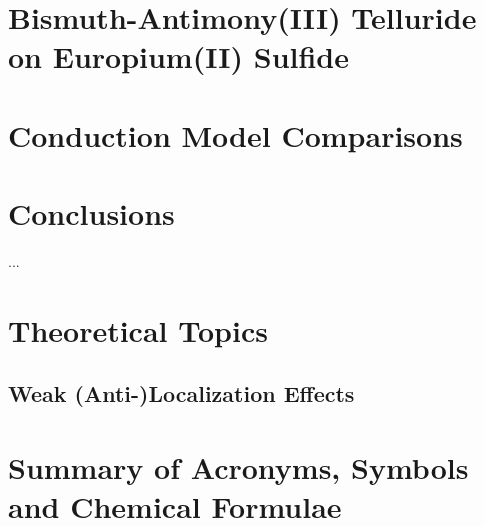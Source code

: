\documentclass{report}
\begin{document}
\chapter{Bismuth-Antimony(III) Telluride on Europium(II) Sulfide}
\label{ch:bilayer2018}

\chapter{Conduction Model Comparisons}
\label{ch:models}

\chapter{Conclusions}
\label{ch:conclusions}
     ...
\appendix
%
\chapter{Theoretical Topics}
\section{Weak (Anti-)Localization Effects}\label{sec:wl}

%
\chapter{Summary of Acronyms, Symbols and Chemical Formulae}
    
%
\printbibliography
\end{document}

